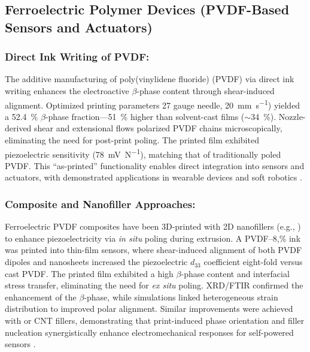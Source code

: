\documentclass[a4paper,fleqn]{cas-sc}
\begin{document}
\subsection*{Ferroelectric Polymer Devices (PVDF-Based Sensors and Actuators)}
\subsubsection*{Direct Ink Writing of PVDF:}

\par The additive manufacturing of poly(vinylidene fluoride) (PVDF) via direct ink writing enhances the electroactive $\beta$-phase content through shear-induced alignment. Optimized printing parameters 27 gauge needle, \SI{20}{\milli\meter\per\second}) yielded a \SI{52.4}{\percent} $\beta$-phase fraction---\SI{51}{\percent} higher than solvent-cast films ($\sim$\SI{34}{\percent}). Nozzle-derived shear and extensional flows polarized PVDF chains microscopically, eliminating the need for post-print poling. The printed film exhibited piezoelectric sensitivity (\SI{78}{\milli\volt\per\newton}), matching that of traditionally poled PVDF. This ``as-printed'' functionality enables direct integration into sensors and actuators, with demonstrated applications in wearable devices and soft robotics \cite{yang2023electrical}.
\subsubsection*{Composite and Nanofiller Approaches: }
\par Ferroelectric PVDF composites have been 3D-printed with 2D nanofillers (e.g., ) to enhance piezoelectricity via \textit{in situ} poling during extrusion. A PVDF--8,\%  ink was printed into thin-film sensors, where shear-induced alignment of both PVDF dipoles and  nanosheets increased the piezoelectric $d_{33}$ coefficient eight-fold versus cast PVDF. The printed film exhibited a high $\beta$-phase content and interfacial stress transfer, eliminating the need for \textit{ex situ} poling. XRD/FTIR confirmed the enhancement of the $\beta$-phase, while simulations linked heterogeneous strain distribution to improved polar alignment. Similar improvements were achieved with  or CNT fillers, demonstrating that print-induced phase orientation and filler nucleation synergistically enhance electromechanical responses for self-powered sensors \cite{islam2023boosting}.
\end{document}
